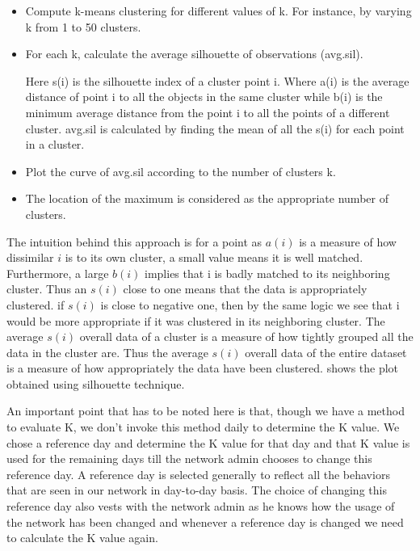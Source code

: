 	\begin{itemize}
		\item Compute k-means clustering for different values of k. For instance, by varying k from 1 to 50 clusters.
		\item For each k, calculate the average silhouette of observations (avg.sil).
		
		\begin{center}
		\end{center}
		Here s(i) is the silhouette index of a cluster point i. Where a(i) is the average distance of point i to all the objects in the same cluster while b(i) is the minimum average distance from the point i to all the points of a different cluster. avg.sil is calculated by finding the mean of all the s(i) for each point in a cluster.
		
		\item Plot the curve of avg.sil according to the number of clusters k.
		\item The location of the maximum is considered as the appropriate number of clusters.
	\end{itemize}
 
  The intuition behind this approach is for a point as $ a(i)$ is a measure of how dissimilar $i$ is to its own cluster, a small value means it is well matched. Furthermore, a large $b(i)$ implies that i is badly matched to its neighboring cluster. Thus an $s(i)$ close to one means that the data is appropriately clustered. if $s(i)$ is close to negative one, then by the same logic we see that i would be more appropriate if it was clustered in its neighboring cluster. The average $s(i)$ overall data of a cluster is a measure of how tightly grouped all the data in the cluster are. Thus the average $s(i)$ overall data of the entire dataset is a measure of how appropriately the data have been clustered.  shows the plot obtained using silhouette technique. 
 
   An important point that has to be noted here is that, though we have a method to evaluate K, we don't invoke this method daily to determine the K value. We chose a reference day and determine the K value for that day and that K value is used for the remaining days till the network admin chooses to change this reference day. A reference day is selected generally to reflect all the behaviors that are seen in our network in day-to-day basis. The choice of changing this reference day also vests with the network admin as he knows how the usage of the network has been changed and whenever a reference day is changed we need to calculate the K value again.
   
